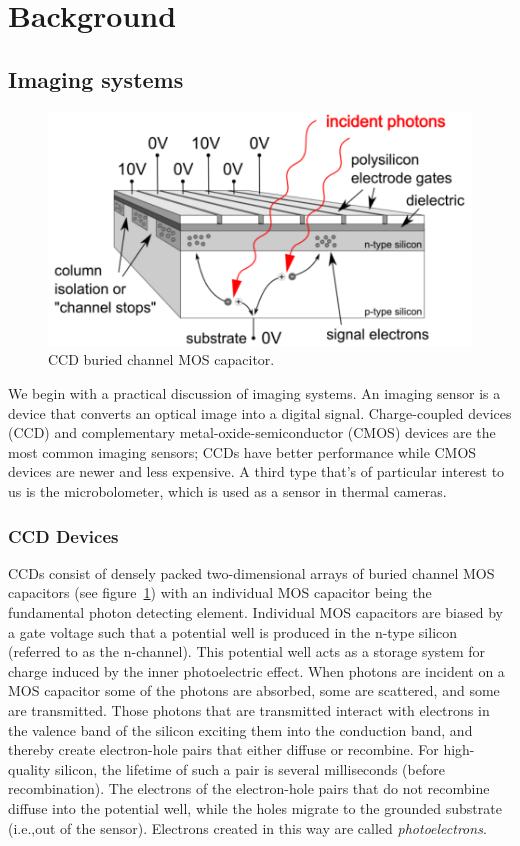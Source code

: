 \section{Background}\label{sec:background}
\localtableofcontents
\subsection{Imaging systems}\label{subsec:imaging-systems}
\begin{figure}
	\includegraphics[width=\linewidth,keepaspectratio]{figures/background/bccd.png}
	\caption{CCD buried channel MOS capacitor\cite{finaltestguideline}.}
	\label{fig:mos-cap}
\end{figure}
We begin with a practical discussion of imaging systems.
%
An imaging sensor is a device that converts an optical image into a digital signal.
%
Charge-coupled devices (CCD) and complementary metal-oxide-semiconductor (CMOS) devices are the most common imaging sensors;
%
CCDs have better performance while CMOS devices are newer and less expensive.
%
A third type that's of particular interest to us is the microbolometer, which is used as a sensor in thermal cameras.
\subsubsection{CCD Devices}
CCDs consist of densely packed two-dimensional arrays of buried channel MOS capacitors (see figure~\ref{fig:mos-cap}) with an individual MOS capacitor being the fundamental photon detecting element.
%
Individual MOS capacitors are biased by a gate voltage such that a potential well is produced in the n-type silicon (referred to as the n-channel).
%
This potential well acts as a storage system for charge induced by the inner photoelectric effect.
%
When photons are incident on a MOS capacitor some of the photons are absorbed, some are scattered, and some are transmitted.
%
Those photons that are transmitted interact with electrons in the valence band of the silicon exciting them into the conduction band, and thereby create electron-hole pairs that either diffuse or recombine.
%
For high-quality silicon, the lifetime of such a pair is several milliseconds (before recombination)\cite{scientificccd}.
%
The electrons of the electron-hole pairs that do not recombine diffuse into the potential well, while the holes migrate to the grounded substrate (i.e.,out of the sensor).
%
Electrons created in this way are called \textit{photoelectrons}.

